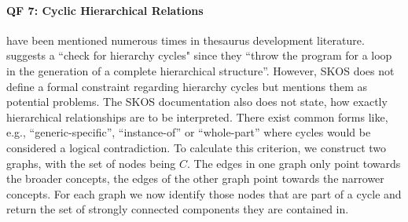 \paragraph{\textbf{QF 7: Cyclic Hierarchical Relations}} have been mentioned numerous times in thesaurus development literature. \cite{Soergel2002} suggests a ``check for hierarchy cycles" since they ``throw the program for a loop in the generation of a complete hierarchical structure''. However, SKOS does not define a formal constraint regarding hierarchy cycles but \cite{SkosReference2008} mentions them as potential problems. The SKOS documentation also does not state, how exactly hierarchical relationships are to be interpreted. There exist common forms like, e.g., ``generic-specific'', ``instance-of'' or ``whole-part'' \cite{Hedden2010,Harpring2010,Aitchison2000} where cycles would be considered a logical contradiction. To calculate this criterion, we construct two graphs, with the set of nodes being $C$. The edges in one graph only point towards the broader concepts, the edges of the other graph point towards the narrower concepts. For each graph we now identify those nodes that are part of a cycle and return the set of strongly connected components they are contained in.

 


